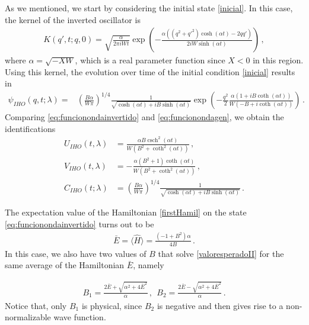 \documentclass[12pt]{iopart}
\begin{document}
As we mentioned, we start by considering the initial state \eqref{inicial}. In this case, the kernel of the inverted oscillator is 
\begin{align}
    K(q',t;q,0)= \sqrt{\frac{\alpha}{2\pi i W t}}\exp{\left(-\frac{\alpha((q^2+q'^2)\cosh\left(\alpha t\right)-2qq')}{2iW\sinh\left(\alpha t\right)}\right)}\,,
    \label{kernelinv}
\end{align}
where $\alpha=\sqrt{-XW}$, which is a real parameter function since $X<0$ in this region.
Using this kernel, the evolution over time of the initial condition \eqref{inicial} results in
\begin{align}
\psi_{IHO}(q,t;\lambda)=&\left( \frac{B \alpha}{W \pi} \right)^{1/4} \frac{1}{\sqrt{\cosh \left(\alpha t\right)+i
   B \sinh \left(\alpha t\right)}}  \exp \left(- \frac{q^2}{2}\frac{ \alpha\left(1+i B \coth
  \left(\alpha t\right)\right)}{W \left(-B+i \coth \left(\alpha t\right)\right)}\right)\,.
   \label{eq:funcionondainvertido}
\end{align}
Comparing \eqref{eq:funcionondainvertido} and \eqref{eq:funcionondagen}, we obtain the identifications  
\begin{subequations}
\begin{align}
    U_{IHO}(t,\lambda)&=\frac{\alpha  B \operatorname{csch}^2\left(\alpha t\right)}{W \left(B^2+\coth^2 \left(\alpha t\right)\right)}\,,\\
    V_{IHO}(t,\lambda)&=-\frac{\alpha  \left(B^2+1\right) \coth \left(\alpha t\right)}{W \left(B^2+\coth^2\left(\alpha t\right)\right)}\,,\\
    C_{IHO}(t;\lambda)&=\left( \frac{B \alpha}{W \pi} \right)^{1/4} \frac{1}{\sqrt{\cosh \left(\alpha t\right)+i
   B \sinh \left(\alpha t\right)}}\,.
\end{align}
\end{subequations}

The expectation value of the Hamiltonian \eqref{firstHamil} on the state \eqref{eq:funcionondainvertido} turns out to be
\begin{align}
\bar E =\langle \hat{H} \rangle =\frac{(-1+B^2)\alpha}{4B}\,.
\label{valoresperadoII}
\end{align}
In this case, we also have two values of $B$ that solve \eqref{valoresperadoII} for the same average of the Hamiltonian $\bar E$, namely

\begin{align}
  B_1 = \frac{2\bar E +\sqrt{\alpha^2 +4 \bar E^2}}{\alpha} \,, \  \  B_2 = \frac{2\bar E -\sqrt{\alpha^2 +4 \bar E^2}}{\alpha}\,.
\end{align}
Notice that, only $B_1$ is physical, since $B_2$ is negative and then gives rise to a non-normalizable wave function.
\end{document}
